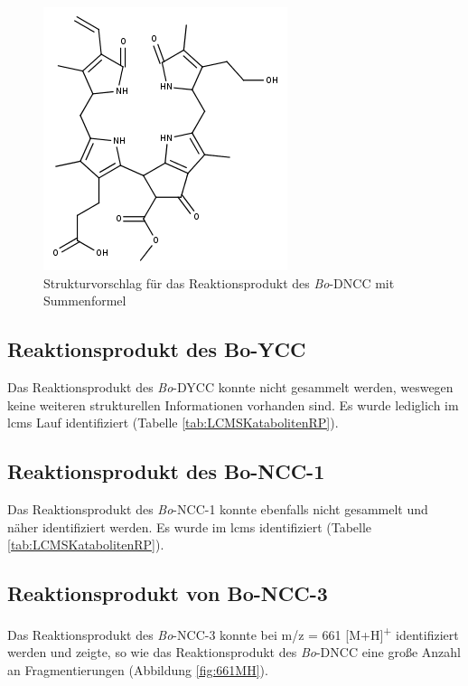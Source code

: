\begin{figure}[!htbp]
  \centering
  \includegraphics[scale=0.6]{figures/Kapitel7/Kataboliten/fragmentation_structures/VWA_Katabolit_633.png}
  \caption[Strukturvorschlag für das Reaktionsprodukt des \textit{Bo}-DNCC, Quelle: Autor]{Strukturvorschlag für das Reaktionsprodukt des \textit{Bo}-DNCC mit Summenformel }
  \label{fig:633MStruktur}
\end{figure}

\pagebreak
\subsection{Reaktionsprodukt des Bo-YCC}

Das Reaktionsprodukt des \textit{Bo}-DYCC konnte nicht gesammelt werden, weswegen keine weiteren strukturellen Informationen vorhanden sind. Es wurde lediglich im \gls{lcms} Lauf identifiziert (Tabelle \ref{tab:LCMSKatabolitenRP}).

\subsection{Reaktionsprodukt des Bo-NCC-1}

Das Reaktionsprodukt des \textit{Bo}-NCC-1 konnte ebenfalls nicht gesammelt und näher identifiziert werden. Es wurde im \gls{lcms} identifiziert (Tabelle \ref{tab:LCMSKatabolitenRP}).

\pagebreak
\subsection{Reaktionsprodukt von Bo-NCC-3} \label{sec:ESIMSRPBoNCC3}

Das Reaktionsprodukt des \textit{Bo}-NCC-3 konnte bei m/z = 661 [M+H]\textsuperscript{+} identifiziert werden und zeigte, so wie das Reaktionsprodukt des \textit{Bo}-DNCC eine große Anzahl an Fragmentierungen (Abbildung \ref{fig:661MH}). 

